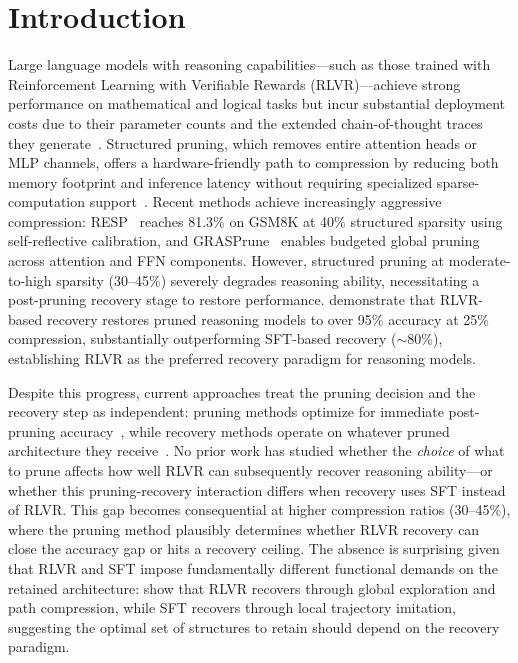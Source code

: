 \section{Introduction}
\label{sec:intro}

Large language models with reasoning capabilities---such as those trained with Reinforcement Learning with Verifiable Rewards (RLVR)---achieve strong performance on mathematical and logical tasks but incur substantial deployment costs due to their parameter counts and the extended chain-of-thought traces they generate~\citep{shao2024grpo}.
Structured pruning, which removes entire attention heads or MLP channels, offers a hardware-friendly path to compression by reducing both memory footprint and inference latency without requiring specialized sparse-computation support~\citep{llmpruner2023,graspprune2026}.
Recent methods achieve increasingly aggressive compression: RESP~\citep{resp2025} reaches 81.3\% on GSM8K at 40\% structured sparsity using self-reflective calibration, and GRASPrune~\citep{graspprune2026} enables budgeted global pruning across attention and FFN components.
However, structured pruning at moderate-to-high sparsity (30--45\%) severely degrades reasoning ability, necessitating a post-pruning recovery stage to restore performance.
\citet{selfhealing2025} demonstrate that RLVR-based recovery restores pruned reasoning models to over 95\% accuracy at 25\% compression, substantially outperforming SFT-based recovery (${\sim}$80\%), establishing RLVR as the preferred recovery paradigm for reasoning models.

Despite this progress, current approaches treat the pruning decision and the recovery step as independent: pruning methods optimize for immediate post-pruning accuracy~\citep{resp2025,graspprune2026,bonsai2025}, while recovery methods operate on whatever pruned architecture they receive~\citep{selfhealing2025,paser2025}.
No prior work has studied whether the \emph{choice} of what to prune affects how well RLVR can subsequently recover reasoning ability---or whether this pruning-recovery interaction differs when recovery uses SFT instead of RLVR.
This gap becomes consequential at higher compression ratios (30--45\%), where the pruning method plausibly determines whether RLVR recovery can close the accuracy gap or hits a recovery ceiling.
The absence is surprising given that RLVR and SFT impose fundamentally different functional demands on the retained architecture: \citet{rlsqueezes2026} show that RLVR recovers through global exploration and path compression, while SFT recovers through local trajectory imitation, suggesting the optimal set of structures to retain should depend on the recovery paradigm.

